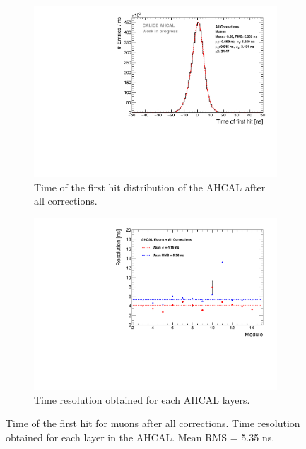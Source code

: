 \begin{figure}[t]
	\begin{subfigure}[t]{0.45\textwidth}
		\centering
		\includegraphics[width=1\textwidth]{chap5/fig_AHCAL_timing/Muons/Timing_AllLayers.pdf}
		\caption{Time of the first hit distribution of the AHCAL after all corrections.}\label{fig:timing_muons}
	\end{subfigure}
	\hfill
	\begin{subfigure}[t]{0.45\textwidth}
		\centering
		\includegraphics[width=1\textwidth]{chap5/fig_AHCAL_timing/Muons/ResolutionPerModule_AllCorrection.pdf}
		\caption{Time resolution obtained for each AHCAL layers.}\label{fig:timing_reso_all_muons}
	\end{subfigure}
	\caption{ Time of the first hit for muons after all corrections.  Time resolution obtained for each layer in the AHCAL. Mean RMS = 5.35 ns.}
\end{figure}

